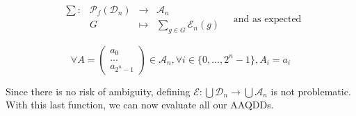 \documentclass{article}
\newcommand{\fonction}[5]{\begin{array}{l|rcl}
#1: & #2 & \longrightarrow & #3 \\
    & #4 & \longmapsto & #5 \end{array}}
\begin{document}
$$\fonction{\sum}{\mathscr{P}_f(\mathcal{D}_n)}{\mathcal{A}_n}{G}{\displaystyle\sum_{g \in G} \mathcal{E}_n(g)}
\quad\text{and as expected}$$

$$\forall A = \begin{pmatrix}
a_0 \\
... \\
a_{2^n - 1}
\end{pmatrix} \in \mathcal{A}_n, \forall i  \in \{0, ..., 2^n - 1\}, A_i = a_i$$

Since there is no risk of ambiguity, defining $\mathcal{E} : \bigcup \mathcal{D}_n \rightarrow \bigcup \mathcal{A}_n$ is not problematic. With this last function, we can now evaluate all our AAQDDs.
\end{document}
